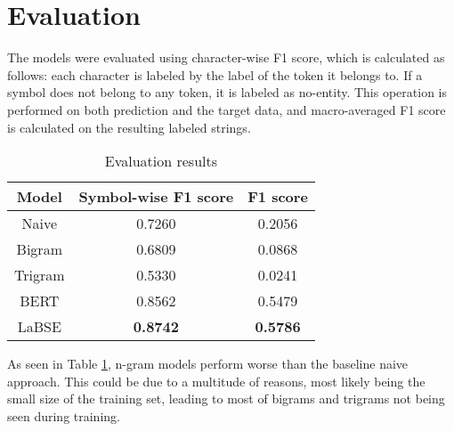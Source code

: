 \documentclass{article}
\begin{document}
\section{Evaluation}

The models were evaluated using character-wise F1 score, which is calculated as
follows: each character is labeled by the label of the token it belongs to. If
a symbol does not belong to any token, it is labeled as no-entity. This
operation is performed on both prediction and the target data, and 
macro-averaged F1 score is calculated on the resulting labeled strings.

\begin{table}[ht]
    \centering
    \begin{tabular}{|c|c|c|}
        \hline
        Model & Symbol-wise F1 score & F1 score \\
        \hline
        Naive & 0.7260 & 0.2056 \\
        Bigram & 0.6809 & 0.0868 \\
        Trigram & 0.5330 & 0.0241 \\
        BERT & 0.8562 & 0.5479 \\
        LaBSE & \textbf{0.8742} & \textbf{0.5786} \\
        \hline
    \end{tabular}
    \caption{Evaluation results}
    \label{tab:results}
\end{table}

As seen in Table \ref{tab:results}, n-gram models perform worse than the
baseline naive approach. This could be due to a multitude of reasons, most
likely being the small size of the training set, leading to most of bigrams
and trigrams not being seen during training.



\end{document}
